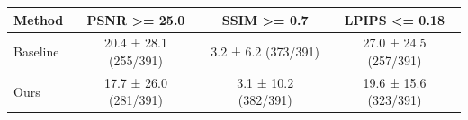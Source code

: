 \begin{tabular}{lccc}
\toprule
Method & PSNR >= 25.0 & SSIM >= 0.7 & LPIPS <= 0.18 \\
\midrule
Baseline & 20.4 ± 28.1 (255/391) & 3.2 ± 6.2 (373/391) & 27.0 ± 24.5 (257/391) \\
Ours & 17.7 ± 26.0 (281/391) & 3.1 ± 10.2 (382/391) & 19.6 ± 15.6 (323/391) \\
\bottomrule
\end{tabular}
